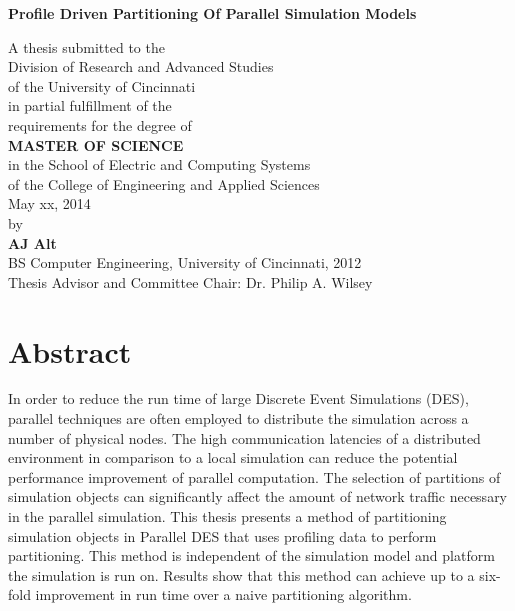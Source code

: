 \documentclass[11pt]{book}
\begin{document}
\thispagestyle{empty}

\doublespacing

\vspace*{0.5in}

\begin{center}
\LARGE{\textbf{Profile Driven Partitioning Of Parallel Simulation Models}}

\vspace*{0.4in}

  {\large A thesis submitted to the\\[0.20in]
    Division of Research and Advanced Studies\\
    of the University of Cincinnati\\[0.20in]
    in partial fulfillment of the\\
    requirements for the degree of\\[0.20in]
    {\bf MASTER OF SCIENCE}\\[0.20in]
    in the School of Electric and Computing Systems\\
    of the College of Engineering and Applied Sciences\\[0.20in]
    May xx, 2014\\[0.20in]
    by\\[0.20in]
    {\bf AJ Alt}\\
    BS Computer Engineering, University of Cincinnati, 2012\\}
  \vspace{0.5in}
  {\large Thesis Advisor and Committee Chair:  Dr. Philip A. Wilsey}
\end{center}

\clearpage

\setcounter{page}{1}
\clearpage

\chapter*{Abstract} 

In order to reduce the run time of large Discrete Event Simulations (DES), parallel techniques are often employed to distribute the simulation across a number of physical nodes. The high communication latencies of a distributed environment in comparison to a local simulation can reduce the potential performance improvement of parallel computation. The selection of partitions of simulation objects can significantly affect the amount of network traffic necessary in the parallel simulation. This thesis presents a method of partitioning simulation objects in Parallel DES that uses profiling data to perform partitioning. This method is independent of the simulation model and platform the simulation is run on. Results show that this method can achieve up to a six-fold improvement in run time over a naive partitioning algorithm. 
\end{document}
